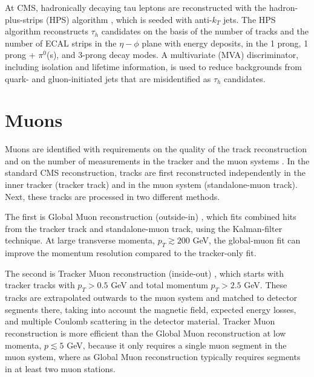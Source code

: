 At CMS, hadronically decaying tau leptons are reconstructed with the hadron-plus-strips (HPS) algorithm \citep{CMS-TAU-14-001}, which is seeded with anti-$k_T$ jets. The HPS algorithm reconstructs $\tau_{h}$ candidates on the basis of the number of tracks and the number of ECAL strips in the $\eta-\phi$ plane with energy deposits, in the 1 prong, 1 prong + $\pi^0$(s), and 3-prong decay modes. A multivariate (MVA) discriminator, including isolation and lifetime information, is used to reduce backgrounds from quark- and gluon-initiated jets that are misidentified as $\tau_{h}$ candidates. 

\section{Muons}
Muons are identified with requirements on the quality of the track reconstruction and on the number of measurements in the tracker and the muon systems \citep{CMS-MUO-10-004}. In the standard CMS reconstruction, tracks are first reconstructed independently in the inner tracker (tracker track) and in the muon system (standalone-muon track). Next, these tracks are processed in two different methods.

The first is Global Muon reconstruction (outside-in) \citep{CMS-MUO-10-004}, which fits combined hits from the tracker track and standalone-muon track, using the Kalman-filter technique. At large transverse momenta, $p_{T} \gtrsim 200$ GeV, the global-muon fit can improve the momentum resolution compared to the tracker-only fit. 

The second is Tracker Muon reconstruction (inside-out) \citep{CMS-MUO-10-004}, which starts with tracker tracks with $p_{T} > 0.5$ GeV and total momentum $p_{T} > 2.5$ GeV. These tracks are extrapolated outwards to the muon system and matched to detector segments there, taking into account the magnetic field, expected energy losses, and multiple Coulomb scattering in the detector material. Tracker Muon reconstruction is more efficient than the Global Muon reconstruction at low momenta, $p \lesssim 5$ GeV, because it only requires a single muon segment in the muon system, where as Global Muon reconstruction typically requires segments in at least two muon stations.

